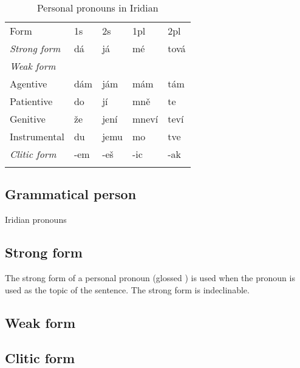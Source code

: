 \begin{table}[h!]
    \small
	\caption{Personal pronouns in Iridian}
	\medskip
	\begin{tabu} to 0.9 \textwidth {Y[3]YYYY}
		\toprule \addlinespace
        {\sc Form} & {\sc 1s} & {\sc 2s} & {\sc 1pl} & {\sc 2pl}\\\addlinespace
		\midrule\addlinespace
        \emph{Strong form}  & dá      & já      & m\'e      & tová \\\addlinespace
        \emph{Weak form}    &           &           &           & \\\addlinespace
        \quad Agentive      & dám     & jám     & mám     & tám\\\addlinespace
        \quad Patientive    & do        & jí      & mn\v{e}      & te\\\addlinespace
        \quad Genitive      & že    & jení    & mneví   & teví\\\addlinespace
        \quad Instrumental  & du        & jemu      & mo        & tve\\\addlinespace
        \emph{Clitic form}  & -em       & -eš   & -ic       & -ak\\\addlinespace
        \bottomrule
	\end{tabu}

\end{table}

\subsection{Grammatical person}
Iridian pronouns

\subsection{Strong form}

The strong form of a personal pronoun (glossed ) is used when the pronoun is used as the topic of the sentence. The strong form is indeclinable.

\subsection{Weak form}

\subsection{Clitic form}

